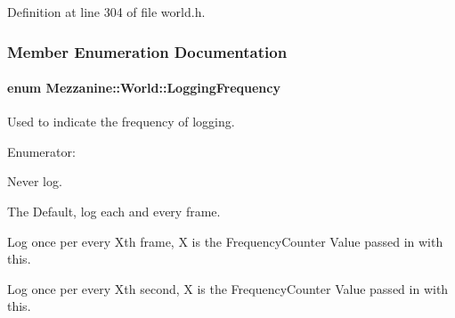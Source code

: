Definition at line 304 of file world.h.



\subsubsection{Member Enumeration Documentation}
\hypertarget{classMezzanine_1_1World_a535c832832bbdebcdc623c3472a32e25}{
\paragraph[{LoggingFrequency}]{\setlength{\rightskip}{0pt plus 5cm}enum {\bf Mezzanine::World::LoggingFrequency}}\hfill}
\label{classMezzanine_1_1World_a535c832832bbdebcdc623c3472a32e25}


Used to indicate the frequency of logging. 

\begin{Desc}
\item[Enumerator: ]\par
\begin{description}
\item[{\em 
\hypertarget{classMezzanine_1_1World_a535c832832bbdebcdc623c3472a32e25abf336536d5cf6396466067a847f64e3d}{
LogNever}
\label{classMezzanine_1_1World_a535c832832bbdebcdc623c3472a32e25abf336536d5cf6396466067a847f64e3d}
}]Never log. \item[{\em 
\hypertarget{classMezzanine_1_1World_a535c832832bbdebcdc623c3472a32e25ac1d6f9aa441fdc15961f28f18bbdbdb2}{
LogOncePerFrame}
\label{classMezzanine_1_1World_a535c832832bbdebcdc623c3472a32e25ac1d6f9aa441fdc15961f28f18bbdbdb2}
}]The Default, log each and every frame. \item[{\em 
\hypertarget{classMezzanine_1_1World_a535c832832bbdebcdc623c3472a32e25a1d4113b21efd91ab73056970906fafe5}{
LogOncePerXFrames}
\label{classMezzanine_1_1World_a535c832832bbdebcdc623c3472a32e25a1d4113b21efd91ab73056970906fafe5}
}]Log once per every Xth frame, X is the FrequencyCounter Value passed in with this. \item[{\em 
\hypertarget{classMezzanine_1_1World_a535c832832bbdebcdc623c3472a32e25adf1caf2c27e4c4e6178c13e8579ab872}{
LogOncePerXSeconds}
\label{classMezzanine_1_1World_a535c832832bbdebcdc623c3472a32e25adf1caf2c27e4c4e6178c13e8579ab872}
}]Log once per every Xth second, X is the FrequencyCounter Value passed in with this. \end{description}
\end{Desc}




